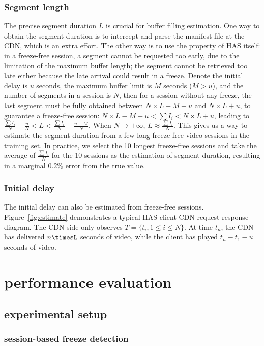 \documentclass[journal]{IEEEtran}
\begin{document}
\subsubsection{Segment length}
The precise segment duration $L$ is crucial for buffer filling estimation. One way to obtain the segment duration is to intercept and parse the manifest file at the CDN, which is an extra effort. The other way is to use the property of HAS itself: in a freeze-free session, a segment cannot be requested too early, due to the limitation of the maximum buffer length; the segment cannot be retrieved too late either because the late arrival could result in a freeze. Denote the initial delay is $u$ seconds, the maximum buffer limit is $M$ seconds ($M>u$), and the number of segments in a session is $N$, then for a session without any freeze, the last segment must be fully obtained between $N\times{L}-M+u$ and $N\times{L}+u$, to guarantee a freeze-free session: 
$N\times{L}-M+u<\sum{I_i}<N\times{L}+u$, 
leading to $\frac{\sum{I_i}}{N}-\frac{u}{N}<L<\frac{\sum{I_i}}{N}-\frac{u-M}{N}$. 
When $N\rightarrow{+\infty}$, $L\approx{\frac{\sum{I_i}}{N}}$. 
This gives us a way to estimate the segment duration from a few long freeze-free video  sessions in the training set. In practice, we select the 10 longest freeze-free sessions and take the average of $\frac{\sum{I_i}}{N}$ for the 10 sessions as the estimation of segment duration, resulting in a marginal $0.2\%$ error from the true value.

\subsubsection{Initial delay}
The initial delay can also be estimated from freeze-free sessions. Figure~\ref{fig:estimate} demonstrates a typical HAS client-CDN request-response diagram. The CDN side only observes $T=\{t_i, 1\leq{i}\leq{N}\}$. At time $t_n$, the CDN has delivered $n\timesL$ seconds of video, while the client has played $t_n-t_1-u$ seconds of video. 

\section{performance evaluation}
\label{sec:exp}
\subsection{experimental setup}
		\subsubsection{session-based freeze detection}
\end{document}
